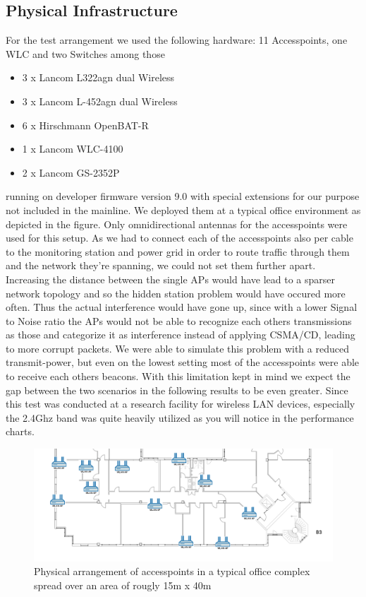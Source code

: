   \subsection{Physical Infrastructure}
    For the test arrangement we used the following hardware:
      11 Accesspoints, one WLC and two Switches among those
      \begin{itemize}
       \item 3 x Lancom L322agn dual Wireless \cite{lancom}
       \item 3 x Lancom L-452agn dual Wireless
       \item 6 x Hirschmann OpenBAT-R
       \item 1 x Lancom WLC-4100
       \item 2 x Lancom GS-2352P
      \end{itemize}
      running on developer firmware version 9.0 with special extensions for our purpose not included in the mainline.
      We deployed them at a typical office environment as depicted in the figure.
      Only omnidirectional antennas for the accesspoints were used for this setup. As we had to connect each of the accesspoints also
      per cable to the monitoring station and power grid in order to route traffic through them and the network they're spanning,
      we could not set them further apart.
      Increasing the distance between the single APs would have lead to a sparser network topology and so the hidden station problem would have occured
      more often. Thus the actual interference would have gone up, since with a lower Signal to Noise ratio the APs would not be able to recognize each others 
      transmissions as those and categorize it as interference instead of applying CSMA/CD, leading to more corrupt packets.
      We were able to simulate this problem with a reduced transmit-power,
      but even on the lowest setting most of the accesspoints were able to receive each others beacons. With this limitation kept in mind we expect
      the gap between the two scenarios in the following results to be even greater.
      Since this test was conducted at a research facility for wireless LAN devices, especially the 2.4Ghz band was quite heavily utilized as you will notice
      in the performance charts.
    \begin{figure}[h!]
      \centering
      \includegraphics[width=1\columnwidth]{figures/Lancom-flur-withaps}
      \caption{Physical arrangement of accesspoints in a typical office complex spread over an area of rougly 15m x 40m}
      \label{fig:2ndfloor}
    \end{figure}

